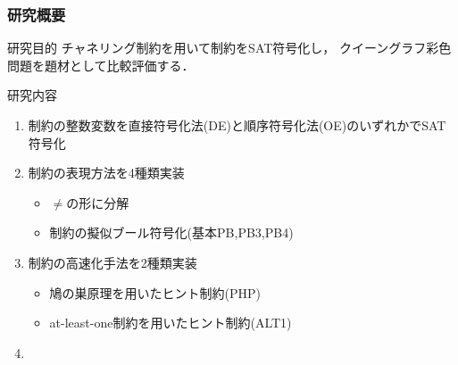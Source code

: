 \documentclass [dvipdfmx,11pt]{beamer}
\begin{document}
\begin{frame}
    \frametitle{研究概要}
    \begin{alertblock}{研究目的}
        チャネリング制約を用いて{\alldiff}制約をSAT符号化し，
        クイーングラフ彩色問題を題材として比較評価する．
    \end{alertblock}
    \begin{block}{研究内容}
        \begin{enumerate}
            \item {\alldiff}制約の整数変数を直接符号化法(DE)と順序符号化法(OE)のいずれかでSAT符号化
            \item {\alldiff}制約の表現方法を4種類実装
                \begin{itemize}
                    \item $\neq$の形に分解
                    \item {\alldiff}制約の擬似ブール符号化(基本PB,PB3,PB4)
                \end{itemize}
            \item {\alldiff}制約の高速化手法を2種類実装
                \begin{itemize}
                    \item 鳩の巣原理を用いたヒント制約(PHP)
                    \item at-least-one制約を用いたヒント制約(ALT1)
                \end{itemize}
            \item {}
        \end{enumerate}
    \end{block}
\end{frame}
\end{document}

